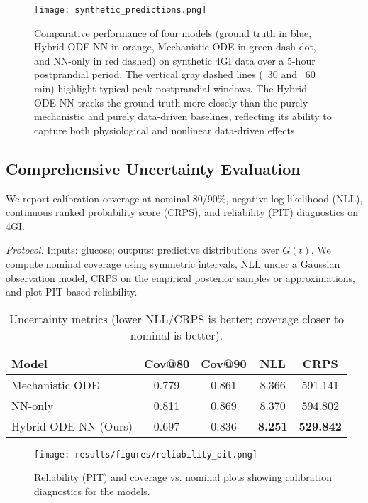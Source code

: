\documentclass[9pt,shortpaper,twoside,web]{ieeecolor}
\begin{document}
\begin{figure}[h]
\centering
\texttt{[image: synthetic\_predictions.png]}
\caption{Comparative performance of four models (ground truth in blue, Hybrid ODE-NN in orange, Mechanistic ODE in green dash-dot, and NN-only in red dashed) on synthetic 4GI data over a 5-hour postprandial period. The vertical gray dashed lines (~30 and ~60 min) highlight typical peak postprandial windows. The Hybrid ODE-NN tracks the ground truth more closely than the purely mechanistic and purely data-driven baselines, reflecting its ability to capture both physiological and nonlinear data-driven effects}
\label{fig:synthetic_predictions}
\end{figure}

\subsection{Comprehensive Uncertainty Evaluation}
\label{subsec:uq_metrics}
We report calibration coverage at nominal 80/90\%, negative log-likelihood (NLL), continuous ranked probability score (CRPS), and reliability (PIT) diagnostics on 4GI.

\noindent\textit{Protocol.} Inputs: glucose; outputs: predictive distributions over $G(t)$. We compute nominal coverage using symmetric intervals, NLL under a Gaussian observation model, CRPS on the empirical posterior samples or approximations, and plot PIT-based reliability.

\begin{table}[h]
\centering
\caption{Uncertainty metrics (lower NLL/CRPS is better; coverage closer to nominal is better).}
\label{tab:uq_metrics}
\begin{tabular}{lcccc}
\toprule
Model & Cov@80 & Cov@90 & NLL & CRPS \\
\midrule
Mechanistic ODE & 0.779 & 0.861 & 8.366 & 591.141 \\
NN-only & 0.811 & 0.869 & 8.370 & 594.802 \\
Hybrid ODE-NN (Ours) & 0.697 & 0.836 & \textbf{8.251} & \textbf{529.842} \\
\bottomrule
\end{tabular}
\end{table}

\begin{figure}[h]
\centering
\texttt{[image: results/figures/reliability\_pit.png]}
\caption{Reliability (PIT) and coverage vs. nominal plots showing calibration diagnostics for the models.}
\label{fig:reliability_pit}
\end{figure}
\end{document}
